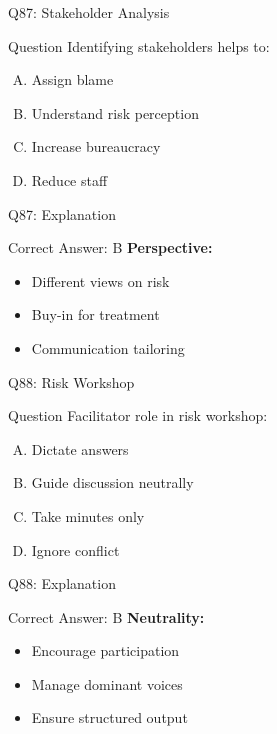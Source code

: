 \documentclass{beamer}
\begin{document}
			\begin{frame}{Q87: Stakeholder Analysis}
				\begin{block}{Question}
					Identifying stakeholders helps to:
				\end{block}
				\begin{enumerate}[(A)]
					\item Assign blame
					\item Understand risk perception
					\item Increase bureaucracy
					\item Reduce staff
				\end{enumerate}
			\end{frame}
			\begin{frame}{Q87: Explanation}
				\begin{block}{Correct Answer: B}
					\textbf{Perspective:}
					\begin{itemize}
						\item Different views on risk
						\item Buy-in for treatment
						\item Communication tailoring
					\end{itemize}
				\end{block}
			\end{frame}
			
			\begin{frame}{Q88: Risk Workshop}
				\begin{block}{Question}
					Facilitator role in risk workshop:
				\end{block}
				\begin{enumerate}[(A)]
					\item Dictate answers
					\item Guide discussion neutrally
					\item Take minutes only
					\item Ignore conflict
				\end{enumerate}
			\end{frame}
			\begin{frame}{Q88: Explanation}
				\begin{block}{Correct Answer: B}
					\textbf{Neutrality:}
					\begin{itemize}
						\item Encourage participation
						\item Manage dominant voices
						\item Ensure structured output
					\end{itemize}
				\end{block}
			\end{frame}
			
\end{document}
